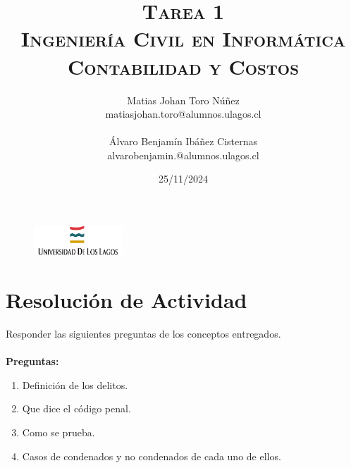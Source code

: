 \documentclass[letter,12pt]{article}
\begin{document}
	\begin{figure}
		\includegraphics[width=0.3\textwidth, left]{figures/download.png}
	\end{figure}
	\setlength{\unitlength}{1 cm} 
	\title{\scshape\Huge{Tarea 1}\\\vspace{3cm}
		\Large Ingeniería Civil en Informática\\\vspace{1cm}
		\Large Contabilidad y Costos\\\vspace{2cm}}
	
	\author{
		Matias Johan Toro Núñez\\
		matiasjohan.toro@alumnos.ulagos.cl\\\\
		Álvaro Benjamín Ibáñez Cisternas\\
		alvarobenjamin.@alumnos.ulagos.cl
	\vspace{3cm}}
	
	\date{25/11/2024}
	\maketitle
	\thispagestyle{empty}
	\clearpage
	\setcounter{page}{1}
	
	\tableofcontents
	\newpage
	
	
	\section{Resolución de Actividad}
	Responder las siguientes preguntas de los conceptos entregados.\\\\
	\textbf{Preguntas:}
	\begin{enumerate}
		\item Definición de los delitos.\\
		\item Que dice el código penal.\\
		\item Como se prueba.\\
		\item Casos de condenados y no condenados de cada uno de ellos.\\\\
	\end{enumerate}
	
\end{document}
